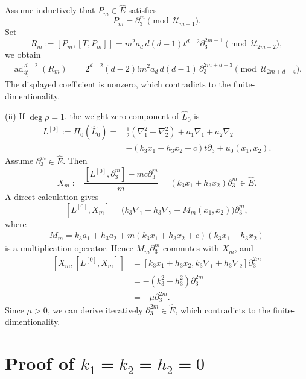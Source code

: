 \documentclass[11pt,a4paper]{article}
\numberwithin{equation}{section}
\theoremstyle{journalplain}
\theoremstyle{journaldef}
\begin{document}
\begin{tcolorbox}[
  title={Proof of Theorem~\ref{thm:sector-I-smooth}},
  breakable
]
Assume inductively that \(P_m\in\widehat E\) satisfies
\[
P_m
=
\partial_3^m
\pmod{\mathcal U_{m-1}}.
\]
Set
\[
R_m:=[P_m,[T,P_m]] =
m^2a_d\,d(d-1)t^{d-2}\partial_3^{2m-1}\pmod{\mathcal U_{2m-2}},
\]
we obtain
\[
\begin{aligned}
\operatorname{ad}_{\partial_3^2}^{\,d-2}(R_m)
={}&
2^{d-2}(d-2)!
m^2a_d\,d(d-1)\,
\partial_3^{2m+d-3}\pmod{\mathcal U_{2m+d-4}}.
\end{aligned}
\]
The displayed coefficient is nonzero, which contradicts to the finite-dimentionality.

(ii) If $\deg \rho = 1$, the weight-zero component of
\(\widehat L_0\) is
\[
\begin{aligned}
L^{[0]}:=\Pi_0(\widehat L_0)
={}&
\frac12(\nabla_1^2+\nabla_2^2)
+a_1\nabla_1+a_2\nabla_2\\
&-(k_3x_1+h_3x_2+c)t\partial_3+u_0(x_1,x_2).
\end{aligned}
\]
Assume \(\partial_3^m\in\widehat E\). Then
\[
X_m
:=
\frac{[L^{[0]},\partial_3^m]-mc\partial_3^m}{m}
=
(k_3x_1+h_3x_2)\partial_3^m
\in\widehat E.
\]
A direct calculation gives
\[
[L^{[0]},X_m]
=
\bigl(
k_3\nabla_1+h_3\nabla_2+M_m(x_1,x_2)
\bigr)\partial_3^m,
\]
where
\[
\begin{aligned}
M_m
=
k_3a_1+h_3a_2+
m(k_3x_1+h_3x_2+c)(k_3x_1+h_3x_2)
\end{aligned}
\]
is a multiplication operator. Hence \(M_m\partial_3^m\) commutes with \(X_m\), and
\[
\begin{aligned}
[X_m,[L^{[0]},X_m]]
&=
[k_3x_1+h_3x_2,k_3\nabla_1+h_3\nabla_2]\partial_3^{2m}\\
&=
-(k_3^2+h_3^2)\partial_3^{2m}\\
&=
-\mu \partial_3^{2m}.
\end{aligned}
\]
Since \(\mu>0\), we can derive iteratively $\partial_3^{2m} \in \widehat E$, which contradicts to the finite-dimentionality.
\end{tcolorbox}


\section{Proof of $k_1 = k_2 = h_2 = 0$}
\end{document}
